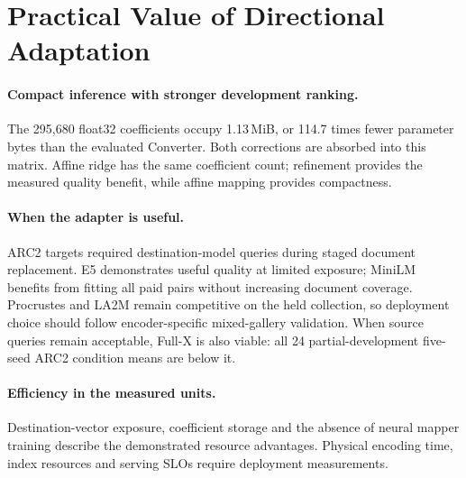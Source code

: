 \section{Practical Value of Directional Adaptation}
\label{sec:discussion}
\paragraph{Compact inference with stronger development ranking.}
The 295,680 float32 coefficients occupy 1.13\,MiB, or 114.7 times fewer
parameter bytes than the evaluated Converter. Both corrections are absorbed
into this matrix. Affine ridge has the same coefficient count; refinement
provides the measured quality benefit, while affine mapping provides compactness.

\paragraph{When the adapter is useful.}
ARC2 targets required destination-model queries during staged document
replacement. E5 demonstrates useful quality at limited exposure; MiniLM
benefits from fitting all paid pairs without increasing document coverage.
Procrustes and LA2M remain competitive on the held collection, so deployment
choice should follow encoder-specific mixed-gallery validation. When source
queries remain acceptable, Full-X is also viable: all 24 partial-development
five-seed ARC2 condition means are below it.

\paragraph{Efficiency in the measured units.}
Destination-vector exposure, coefficient storage and the absence of neural
mapper training describe the demonstrated resource advantages. Physical
encoding time, index resources and serving SLOs require deployment measurements.
